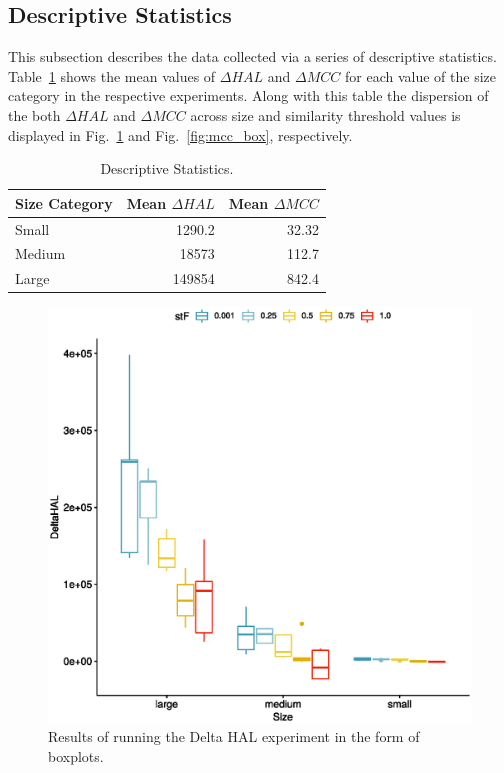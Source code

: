 \documentclass[conference]{IEEEtran}
\begin{document}
\hypertarget{sec:desc_stats}{%
\subsection{Descriptive Statistics}\label{sec:desc_stats}}

This subsection describes the data collected via a series of descriptive
statistics. Table~\ref{tbl:descriptive} shows the mean values of
\(\Delta HAL\) and \(\Delta MCC\) for each value of the size category in
the respective experiments. Along with this table the dispersion of the
both \(\Delta HAL\) and \(\Delta MCC\) across size and similarity
threshold values is displayed in Fig.~\ref{fig:hal_box} and
Fig.~\ref{fig:mcc_box}, respectively.

\begin{table}[tb]
\caption{Descriptive Statistics.}
\label{tbl:descriptive}
\begin{tabular}{lrr}
\hline
\textbf{Size Category} & \textbf{Mean $\Delta HAL$} & \textbf{Mean $\Delta MCC$}\tabularnewline
\hline
Small & 1290.2 & 32.32\tabularnewline
Medium & 18573 & 112.7\tabularnewline
Large & 149854 & 842.4\tabularnewline
\hline
\end{tabular}
\end{table}

\begin{figure}
\hypertarget{fig:hal_box}{%
\centering
\includegraphics{images/paper/results/hal_box.eps}
\caption{Results of running the Delta HAL experiment in the form of
boxplots.}\label{fig:hal_box}
}
\end{figure}
\end{document}
